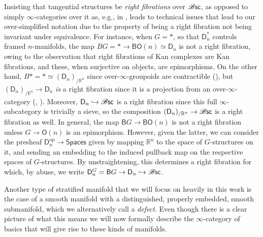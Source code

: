 \documentclass[../text]{subfiles}
\begin{document}
\begin{remark}\label{16GY5V1}
    Insisting that tangential structures be \emph{right fibrations} over $\mathscr{B} \mathsf{sc}$, as opposed to simply $\infty$-categories over it as, e.g., in \cite{ayala2020factorization}, leads to technical issues that lead to our over-simplified notation due to the property of being a right fibration not being invariant under equivalence. For instance, when $G=\ast$, so that $\mathsf{D}^\ast_n$ controls framed $n$-manifolds, the map $BG=\ast\to \mathsf{BO}(n)\simeq\mathsf{D}_n$ is not a right fibration, owing to the observation that right fibrations of Kan complexes are Kan fibrations, and these, when surjective on objects, are epimorphisms. On the other hand, $B\ast=\ast\simeq (\mathsf{D}_n)_{/\mathbb{R}^n}$ since over-$\infty$-groupoids are contractible (\cite[\href{https://kerodon.net/tag/018Y}{018Y}]{lurie_kerodon}), but $(\mathsf{D}_n)_{/\mathbb{R}^n}\to \mathsf{D}_n$ \emph{is} a right fibration since it is a projection from an over-$\infty$-category (\cite[\href{https://kerodon.net/tag/018F}{018F}]{lurie_kerodon}, \cite{joyal}). Moreover, $\mathsf{D}_n\hookrightarrow \mathscr{B} \mathsf{sc}$ is a right fibration since this full $\infty$-subcategory is trivially a sieve, so the composition $(\mathsf{D}_n)_{/\mathbb{R}^n}\to \mathscr{B} \mathsf{sc}$ is a right fibration as well. In general, the map $\mathsf{B}G\to \mathsf{BO}(n)$ is not a right fibration unless $G\to\mathsf{O}(n)$ is an epimorphism. However, given the latter, we can consider the presheaf $\mathsf{D}_n^{\text{op}}\to\mathsf{Spaces}$ given by mapping $\mathbb{R}^n$ to the space of $G$-structures on it, and sending an embedding to the induced pullback map on the respective spaces of $G$-structures. By unstraightening, this determines a right fibration for which, by abuse, we write $\mathsf{D}^G_n=\mathsf{B}G\to \mathsf{D}_n\hookrightarrow\mathscr{B} \mathsf{sc}$.
\end{remark}

Another type of stratified manifold that we will focus on heavily in this work is the case of a smooth manifold with a distinguished, properly embedded, smooth submanifold, which we alternatively call a \emph{defect}. Even though there is a clear picture of what this means we will now formally describe the $\infty$-category of basics that will give rise to these kinds of manifolds.
\end{document}
